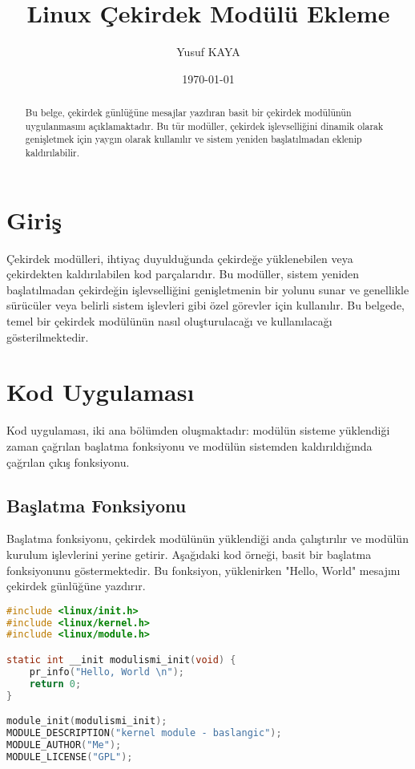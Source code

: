 \documentclass[a4paper,12pt]{article}
\title{Linux Çekirdek Modülü Ekleme}
\author{Yusuf KAYA}
\date{\today}
\begin{document}
\vspace*{-1.5cm}  %
\maketitle

\begin{abstract}
Bu belge, çekirdek günlüğüne mesajlar yazdıran basit bir çekirdek modülünün uygulanmasını açıklamaktadır. Bu tür modüller, çekirdek işlevselliğini dinamik olarak genişletmek için yaygın olarak kullanılır ve sistem yeniden başlatılmadan eklenip kaldırılabilir.
\end{abstract}

\section{Giriş}
Çekirdek modülleri, ihtiyaç duyulduğunda çekirdeğe yüklenebilen veya çekirdekten kaldırılabilen kod parçalarıdır. Bu modüller, sistem yeniden başlatılmadan çekirdeğin işlevselliğini genişletmenin bir yolunu sunar ve genellikle sürücüler veya belirli sistem işlevleri gibi özel görevler için kullanılır. Bu belgede, temel bir çekirdek modülünün nasıl oluşturulacağı ve kullanılacağı gösterilmektedir.

\section{Kod Uygulaması}

Kod uygulaması, iki ana bölümden oluşmaktadır: modülün sisteme yüklendiği zaman çağrılan başlatma fonksiyonu ve modülün sistemden kaldırıldığında çağrılan çıkış fonksiyonu.

\subsection{Başlatma Fonksiyonu}
Başlatma fonksiyonu, çekirdek modülünün yüklendiği anda çalıştırılır ve modülün kurulum işlevlerini yerine getirir. Aşağıdaki kod örneği, basit bir başlatma fonksiyonunu göstermektedir. Bu fonksiyon, yüklenirken "Hello, World" mesajını çekirdek günlüğüne yazdırır.

\begin{lstlisting}[language=C, caption={Başlatma fonksiyonu}]
#include <linux/init.h>
#include <linux/kernel.h>
#include <linux/module.h>

static int __init modulismi_init(void) {
    pr_info("Hello, World \n");
    return 0;
}

module_init(modulismi_init);
MODULE_DESCRIPTION("kernel module - baslangic");
MODULE_AUTHOR("Me");
MODULE_LICENSE("GPL");

\end{lstlisting}
\end{document}
